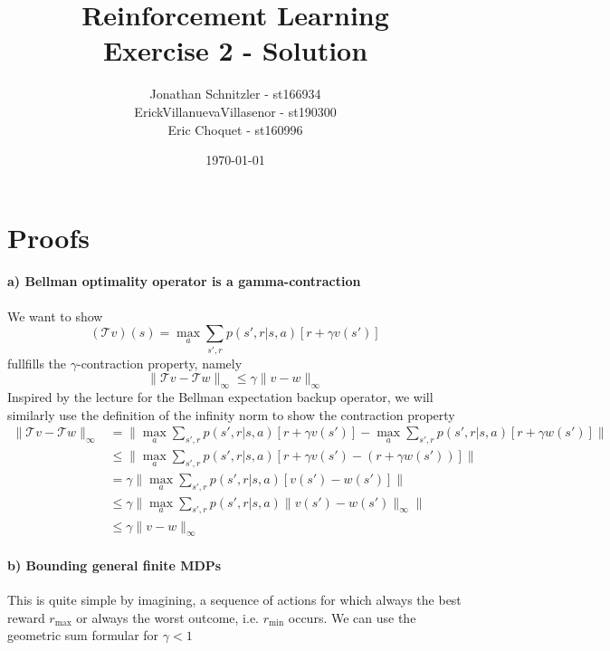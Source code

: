 \documentclass{article}
\title{Reinforcement Learning \\ Exercise 2 - Solution}
\author{Jonathan Schnitzler - st166934 \\
ErickVillanuevaVillasenor - st190300 \\
Eric Choquet - st160996}
\date{\today}
\begin{document}
\maketitle
\section*{Proofs}

\paragraph*{a) Bellman optimality operator is a gamma-contraction}
We want to show
\begin{equation}
    (\mathcal{T}v)(s) = \max_a \sum_{s', r} p(s', r|s,a)[r + \gamma v(s')]
\end{equation}
fullfills the $\gamma$-contraction property, namely
\begin{equation}
    \|\mathcal{T}v - \mathcal{T}w\|_\infty \leq \gamma \|v - w\|_\infty
\end{equation}
Inspired by the lecture for the Bellman expectation backup operator, we will similarly use the definition of the infinity norm to show the contraction property
\begin{align}
    \|\mathcal{T}v - \mathcal{T}w\|_\infty &= \| \max_a \sum_{s', r} p(s', r|s,a)[r + \gamma v(s')] - \max_a \sum_{s', r} p(s', r|s,a)[r + \gamma w(s')] \| \\
    &\leq \| \max_a \sum_{s', r} p(s', r|s,a)[r + \gamma v(s') - (r + \gamma w(s'))] \| \\
    &=\gamma \| \max_a \sum_{s', r} p(s', r|s,a) [v(s') - w(s')] \| \\
    &\leq \gamma \| \max_a \sum_{s', r} p(s', r|s,a) \|v(s') - w(s')\|_\infty \| \\
    &\leq \gamma \|v - w\|_\infty
\end{align}

\paragraph*{b) Bounding general finite MDPs}
This is quite simple by imagining, a sequence of actions for which always the best reward $r_{\text{max}}$ or always the worst outcome, i.e. $r_{\text{min}}$ occurs. We can use the geometric sum formular for $\gamma < 1$
\end{document}
